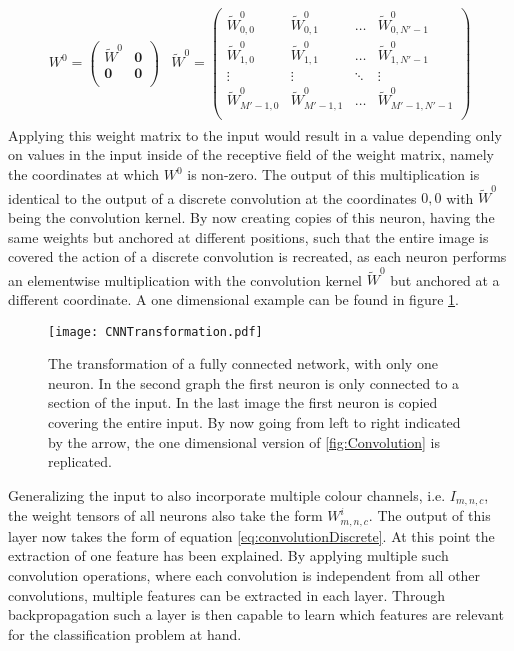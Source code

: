 \begin{align}
\begin{split}
W^0 = 
\begin{pmatrix}
\tilde{W}^0 & \boldsymbol{0} \\
\boldsymbol{0} & \boldsymbol{0} \\
\end{pmatrix}
\end{split}
\begin{split}
\tilde{W}^0 = 
\begin{pmatrix}
\tilde{W}_{0,0}^0 & \tilde{W}_{0,1}^0 & \dots & \tilde{W}_{0,N'-1}^0 \\
\tilde{W}_{1,0}^0 & \tilde{W}_{1,1}^0 & \dots & \tilde{W}_{1,N'-1}^0 \\
\vdots & \vdots & \ddots & \vdots \\
\tilde{W}_{M'-1,0}^0 & \tilde{W}_{M'-1,1}^0 & \dots & \tilde{W}_{M'-1,N'-1}^0 \\
\end{pmatrix}
\end{split}
\end{align}
Applying this weight matrix to the input would result in a value depending only on values in the input inside of the receptive field of the weight matrix, namely the coordinates at which $W^0$ is non-zero. The output of this multiplication is identical to the output of a discrete convolution at the coordinates $0,0$ with $\tilde{W}^0$ being the convolution kernel. By now creating copies of this neuron, having the same weights but anchored at different positions, such that the entire image is covered the action of a discrete convolution is recreated, as each neuron performs an elementwise multiplication with the convolution kernel $\tilde{W}^0$ but anchored at a different coordinate. A one dimensional example can be found in figure \ref{fig:CNNTransformation}.\\

\begin{figure}[H]
\centering
\texttt{[image: CNNTransformation.pdf]}
\caption{The transformation of a fully connected network, with only one neuron. In the second graph the first neuron is only connected to a section of the input. In the last image the first neuron is copied covering the entire input. By now going from left to right indicated by the arrow, the one dimensional version of \ref{fig:Convolution} is replicated.}
\label{fig:CNNTransformation}
\end{figure}

Generalizing the input to also incorporate multiple colour channels, i.e. $I_{m,n,c}$, the weight tensors of all neurons also take the form $W^i_{m,n,c}$. The output of this layer now takes the form of equation \ref{eq:convolutionDiscrete}. At this point the extraction of one feature has been explained. By applying multiple such convolution operations, where each convolution is independent from all other convolutions, multiple features can be extracted in each layer. Through backpropagation such a layer is then capable to learn which features are relevant for the classification problem at hand. \\

